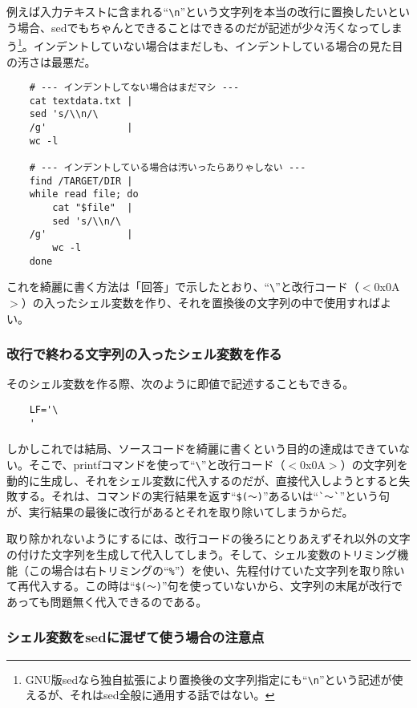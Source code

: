 例えば入力テキストに含まれる``\verb|\n|''という文字列を本当の改行に置換したいという場合、sedでもちゃんとできることはできるのだが記述が少々汚くなってしまう\footnote{GNU版sedなら独自拡張により置換後の文字列指定にも``\verb|\n|''という記述が使えるが、それはsed全般に通用する話ではない。}。インデントしていない場合はまだしも、インデントしている場合の見た目の汚さは最悪だ。\\
\begin{frameboxit}{160.0mm}
\begin{verbatim}
	# --- インデントしてない場合はまだマシ ---
	cat textdata.txt |
	sed 's/\\n/\
	/g'              |
	wc -l

	# --- インデントしている場合は汚いったらありゃしない ---
	find /TARGET/DIR |
	while read file; do
	    cat "$file"  |
	    sed 's/\\n/\
	/g'              |
	    wc -l
	done
\end{verbatim}
\end{frameboxit}

これを綺麗に書く方法は「回答」で示したとおり、``\verb|\|''と改行コード（$<$0x0A$>$）の入ったシェル変数を作り、それを置換後の文字列の中で使用すればよい。

\subsubsection*{改行で終わる文字列の入ったシェル変数を作る}

そのシェル変数を作る際、次のように即値で記述することもできる。
\begin{verbatim}
	LF='\
	'
\end{verbatim}

しかしこれでは結局、ソースコードを綺麗に書くという目的の達成はできていない。そこで、printfコマンドを使って``\verb|\|''と改行コード（$<$0x0A$>$）の文字列を動的に生成し、それをシェル変数に代入するのだが、直接代入しようとすると失敗する。それは、コマンドの実行結果を返す``\verb|$(～)|''あるいは``\verb|`～`|''という句が、実行結果の最後に改行があるとそれを取り除いてしまうからだ。

取り除かれないようにするには、改行コードの後ろにとりあえずそれ以外の文字の付けた文字列を生成して代入してしまう。そして、シェル変数のトリミング機能（この場合は右トリミングの``\verb|%|''）を使い、先程付けていた文字列を取り除いて再代入する。この時は``\verb|$(～)|''句を使っていないから、文字列の末尾が改行であっても問題無く代入できるのである。

\subsubsection*{シェル変数をsedに混ぜて使う場合の注意点}

